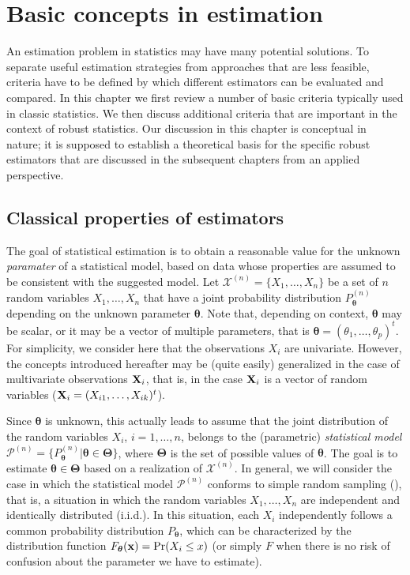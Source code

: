 
\chapter{Basic concepts in estimation}
\label{chap:theory}

An estimation problem in statistics may have many potential solutions. To
separate useful estimation strategies from approaches that are less feasible,
criteria have to be defined by which different estimators can be evaluated and
compared. In this chapter we first review a number of basic criteria typically
used in classic statistics. We then discuss additional criteria that are
important in the context of robust statistics. Our discussion in this chapter
is conceptual in nature; it is supposed to establish a theoretical basis for
the specific robust estimators that are discussed in the subsequent chapters
from an applied perspective.

\section{Classical properties of estimators}

The goal of statistical estimation is to obtain a reasonable value for the
unknown \emph{paramater} of a statistical model, based on data whose properties
are assumed to be consistent with the suggested model. Let $\mathcal{X}^{(n)} =
\{X_1, \dots, X_n\}$                                           
be a set of $n$ random variables $X_1, \ldots, X_n$ that have a joint
probability distribution $P_{\boldsymbol\theta}^{(n)}$ depending on the unknown
parameter $\boldsymbol\theta$. Note that, depending on context,
$\boldsymbol\theta$ may be scalar, or it may be a vector of multiple parameters,
that is $\boldsymbol\theta = (\theta_1, \dots, \theta_p)^t$. For simplicity, we consider here that the observations $X_i$ are univariate. However, the concepts introduced hereafter may be (quite easily) generalized in the case of multivariate observations $\mathbf X_i$, that is, in the case $\mathbf X_i$ is a vector of random variables ($\mathbf X_i=(X_{i1},\ldots,X_{ik})^t$).

Since $\boldsymbol\theta$ is unknown, this actually leads to assume that the joint distribution of the random variables $X_i$, $i=1,
\dots, n$, belongs to the (parametric) \emph{statistical model} $\mathcal{P}^{(n)} =
\{P_{\boldsymbol\theta}^{(n)} | \boldsymbol\theta \in \boldsymbol\Theta\}$,    
where $\boldsymbol\Theta$ is the set of possible values of $\boldsymbol\theta$. 
The goal is to estimate $\boldsymbol\theta \in \boldsymbol\Theta$ based on a
realization of $\mathcal{X}^{(n)}$. In general, we will consider the case in
which the statistical model $\mathcal{P}^{(n)}$ conforms to simple random
sampling (), that is, a situation in which the random variables
$X_1, \dots, X_n$ are independent and identically distributed
(i.i.d.). In this situation, each $X_i$ independently follows a common probability
distribution $P_{\boldsymbol\theta}$, which can be characterized by the
distribution function $F_{\boldsymbol\theta}(\mathbf x) = \Pr(X_i \leq x)$ (or simply $F$ when there is no risk of confusion about
the parameter we have to estimate).


